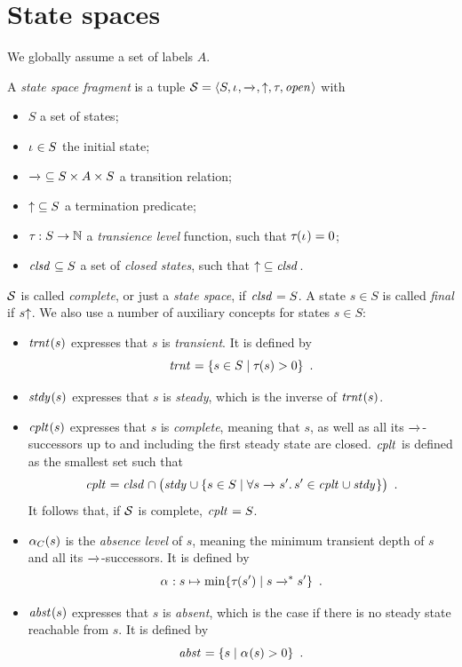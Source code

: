 \documentclass{article}
\begin{document}
\section*{State spaces}

\medskip\noindent
We globally assume a set of labels $A$.

\medskip\noindent 
A \emph{state space fragment} is a tuple $\cS=\tupof{S,\Init,{\trans{}},{\final},\TLevel,\Open}$ with
\begin{itemize}
\item $S$ a set of states;
\item $\Init\in S$ the initial state;
\item ${\trans{}}\subseteq S\times A\times S$ a transition relation;
\item ${\final}\subseteq S$ a termination predicate;
\item ${\TLevel}:S\to \natN$ a \emph{transience level} function, such that $\TLevel(\Init)=0$;
\item $\Closed\subseteq S$ a set of \emph{closed states}, such that $\final\subseteq \Closed$.
\end{itemize}
%
$\cS$ is called \emph{complete}, or just a \emph{state space}, if $\Closed=S$. A state $s\in S$ is called \emph{final} if $s\final$. We also use a number of auxiliary concepts for states $s\in S$:

\begin{itemize}
\item $\Transient(s)$ expresses that $s$ is \emph{transient}. It is defined by
%
\[ \Transient = \gensetof{s\in S}{\TLevel(s)>0} \enspace. \]

\item $\Steady(s)$ expresses that $s$ is \emph{steady}, which is the inverse of $\Transient(s)$.

\item $\Complete(s)$ expresses that $s$ is \emph{complete}, meaning that $s$, as well as all its $\trans{}$-successors up to and including the first steady state are closed. $\Complete$ is defined as the smallest set such that
%
\[ \Complete = \Closed\cap \bigl(\Steady \cup \gensetof{s\in S}{\forall s\trans{} s'.\, s'\in \Complete\cup \Steady}\bigr) \enspace.
\]
It follows that, if $\cS$ is complete, $\Complete=S$.

\item $\ALevel[C](s)$ is the \emph{absence level} of $s$, meaning the minimum transient depth of $s$ and all its $\trans{}$-successors. It is defined by
%
\[ \ALevel: s\mapsto \min\gensetof{\TLevel(s')}{s\trans{}^* s'} \enspace. \]

\item $\Absent(s)$ expresses that $s$ is \emph{absent}, which is the case if there is no steady state reachable from $s$. It is defined by
%
\[ \Absent= \gensetof{s}{\ALevel(s)>0} \enspace. \]
\end{itemize}
\end{document}
